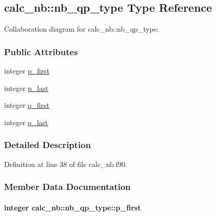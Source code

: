 \hypertarget{structcalc__nb_1_1nb__qp__type}{\subsection{calc\-\_\-nb\-:\-:nb\-\_\-qp\-\_\-type Type Reference}
\label{structcalc__nb_1_1nb__qp__type}
}


Collaboration diagram for calc\-\_\-nb\-:\-:nb\-\_\-qp\-\_\-type\-:
\subsubsection*{Public Attributes}
\begin{DoxyCompactItemize}
\item 
integer \hyperlink{structcalc__nb_1_1nb__qp__type_afe8efc2b5a67cd29b855e4632928752c}{p\-\_\-first}
\item 
integer \hyperlink{structcalc__nb_1_1nb__qp__type_afc37ae377df00801927b168f389095cd}{p\-\_\-last}
\item 
integer \hyperlink{structcalc__nb_1_1nb__qp__type_a14154a509a398559e767b5e17180a93e}{q\-\_\-first}
\item 
integer \hyperlink{structcalc__nb_1_1nb__qp__type_a8d11c49e691ce78272cc2b5e288ddf35}{q\-\_\-last}
\end{DoxyCompactItemize}


\subsubsection{Detailed Description}


Definition at line 38 of file calc\-\_\-nb.\-f90.



\subsubsection{Member Data Documentation}
\hypertarget{structcalc__nb_1_1nb__qp__type_afe8efc2b5a67cd29b855e4632928752c}{
\paragraph[{p\-\_\-first}]{\setlength{\rightskip}{0pt plus 5cm}integer calc\-\_\-nb\-::nb\-\_\-qp\-\_\-type\-::p\-\_\-first}}\label{structcalc__nb_1_1nb__qp__type_afe8efc2b5a67cd29b855e4632928752c}


